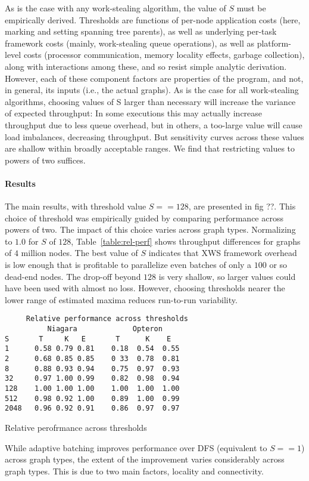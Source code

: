 As is the case with any work-stealing algorithm, the value of $S$ must
be empirically derived. Thresholds are functions of per-node
application costs (here, marking and setting spanning tree parents),
as well as underlying per-task framework costs (mainly, work-stealing
queue operations), as well as platform-level costs (processor
communication, memory locality effects, garbage collection), along
with interactions among these, and so resist simple analytic
derivation.  However, each of these component factors are properties
of the program, and not, in general, its inputs (i.e., the actual
graphs).  As is the case for all work-stealing algorithms, choosing
values of S larger than necessary will increase the variance of
expected throughput: In some executions this may actually increase
throughput due to less queue overhead, but in others, a too-large
value will cause load imbalances, decreasing throughput.  But
sensitivity curves across these values are shallow within broadly
acceptable ranges. We find that restricting values to powers of two
suffices.

\paragraph{Results}

The main results, with threshold value $S==128$, are presented in 
fig ??.  This choice of threshold was empirically guided by comparing
performance across powers of two. The impact of this choice varies
across graph types. Normalizing to $1.0$ for $S$ of $128$,
Table~\ref{table:rel-perf} shows throughput differences for graphs of
$4$ million nodes.  The best value of $S$ indicates that XWS framework
overhead is low enough that is profitable to parallelize even batches
of only a $100$ or so dead-end nodes. The drop-off beyond $128$ is
very shallow, so larger values could have been used with almost no
loss.  However, choosing thresholds nearer the lower range of
estimated maxima reduces run-to-run variability.

\begin{table}
{\footnotesize
\begin{verbatim}
     Relative performance across thresholds
          Niagara             Opteron
S       T     K   E       T      K    E
1      0.58 0.79 0.81    0.18  0.54  0.55
2      0.68 0.85 0.85    0 33  0.78  0.81
8      0.88 0.93 0.94    0.75  0.97  0.93
32     0.97 1.00 0.99    0.82  0.98  0.94
128    1.00 1.00 1.00    1.00  1.00  1.00
512    0.98 0.92 1.00    0.89  1.00  0.99
2048   0.96 0.92 0.91    0.86  0.97  0.97
\end{verbatim}}
\caption{Relative perofrmance across thresholds}\label{table:rel-perf}
\end{table}
While adaptive batching improves performance over DFS (equivalent to
$S==1$) across graph types, the extent of the improvement varies
considerably across graph types. This is due to two main factors,
locality and connectivity.

